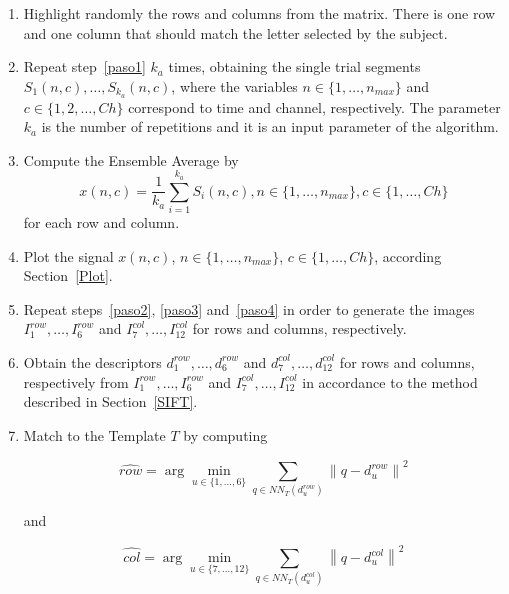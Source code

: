\documentclass[entropy,article,submit,moreauthors,pdftex,10pt,a4paper]{mdpi}
\begin{document}
\begin{enumerate}
\item \label{paso1}Highlight randomly the rows and columns from the matrix.  There is one row and one column that should match the letter selected by the subject.
\item  \label{paso2} Repeat step~\ref{paso1} $k_a$ times, obtaining the single trial segments $S_1(n,c),\dots,S_{k_a}(n,c)$, where the variables $n \in \{1, \dots, n_{max}\}$ and $c \in \{1,2,\dots,Ch\}$ correspond to time and channel, respectively. The parameter $k_a$ is the number of repetitions and it is an input parameter of the algorithm.
\item \label{paso3} Compute the Ensemble Average by
\begin{equation}
x(n,c)= \frac{1}{k_a}\sum_{i=1}^{k_a}S_i(n,c),n \in \{1, \dots, n_{max}\}, c \in \{1,\dots,Ch\}
\label{averaging}
\end{equation}  
for each row and column. 

\item \label{paso4}Plot the signal $x(n,c)$,  $n \in \{1, \dots, n_{max}\}$, $c \in \{1,\dots,Ch\}$,  according Section~\ref{Plot}. 

\item Repeat steps~\ref{paso2}, \ref{paso3} and~\ref{paso4} in order to generate the images $I^{row}_1, \dots, I^{row}_6$ and $I^{col}_7,\dots,I^{col}_{12}$ for rows and columns, respectively. 

\item Obtain the descriptors $ d^{row}_1, \dots,  d^{row}_6 $  and  $ d^{col}_7, \dots,  d^{col}_{12} $ for rows and columns, respectively from $I^{row}_1, \dots, I^{row}_6$ and $I^{col}_7,\dots,I^{col}_{12}$  in accordance to the method described in Section~\ref{SIFT}. 

\item Match to the Template $T$ by computing  

\begin{equation}
\hat{row} = \arg \min_{u \in \{1,\dots,6\}} \sum_{q \in NN_T(d^{row}_u)}^{} \left\lVert q -  d^{row}_u \right\rVert ^2
\label{eq:multiclassificationrow}
\end{equation}

\noindent and

\begin{equation}
\hat{col} = \arg \min_{u \in \{7,\dots,12\}} \sum_{q \in NN_T(d^{col}_u)}^{} \left\lVert q -  d^{col}_u \right\rVert ^2
\label{eq:multiclassificationcol}
\end{equation}


\end{enumerate}
\end{document}
